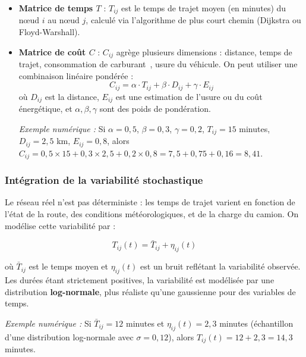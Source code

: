 \documentclass[11pt,a4paper]{report}
\begin{document}
\begin{itemize}
    \item \textbf{Matrice de temps $T$} : $T_{ij}$ est le temps de trajet moyen (en minutes) du nœud $i$ au nœud $j$, calculé via l'algorithme de plus court chemin (Dijkstra ou Floyd-Warshall).
    
    \item \textbf{Matrice de coût $C$} : $C_{ij}$ agrège plusieurs dimensions : distance, temps de trajet, consommation de carburant~\cite{GuangweiLiu2019}, usure du véhicule. On peut utiliser une combinaison linéaire pondérée :
    \begin{equation}
        C_{ij} = \alpha \cdot T_{ij} + \beta \cdot D_{ij} + \gamma \cdot E_{ij}
    \end{equation}
    où $D_{ij}$ est la distance, $E_{ij}$ est une estimation de l'usure ou du coût énergétique, et $\alpha, \beta, \gamma$ sont des poids de pondération.
    
    \textit{Exemple numérique :} Si $\alpha = 0{,}5$, $\beta = 0{,}3$, $\gamma = 0{,}2$, $T_{ij} = 15$ minutes, $D_{ij} = 2{,}5$ km, $E_{ij} = 0{,}8$, alors $C_{ij} = 0{,}5 \times 15 + 0{,}3 \times 2{,}5 + 0{,}2 \times 0{,}8 = 7{,}5 + 0{,}75 + 0{,}16 = 8{,}41$.
\end{itemize}

\subsubsection*{Intégration de la variabilité stochastique}

Le réseau réel n'est pas déterministe : les temps de trajet varient en fonction de l'état de la route, des conditions météorologiques, et de la charge du camion. On modélise cette variabilité par :

\begin{equation}
    T_{ij}(t) = \bar{T}_{ij} + \eta_{ij}(t)
\end{equation}

où $\bar{T}_{ij}$ est le temps moyen et $\eta_{ij}(t)$ est un bruit reflétant la variabilité observée. Les durées étant strictement positives, la variabilité est modélisée par une distribution \textbf{log-normale}, plus réaliste qu'une gaussienne pour des variables de temps.

\textit{Exemple numérique :} Si $\bar{T}_{ij} = 12$ minutes et $\eta_{ij}(t) = 2{,}3$ minutes (échantillon d'une distribution log-normale avec $\sigma = 0{,}12$), alors $T_{ij}(t) = 12 + 2{,}3 = 14{,}3$ minutes.
\end{document}
